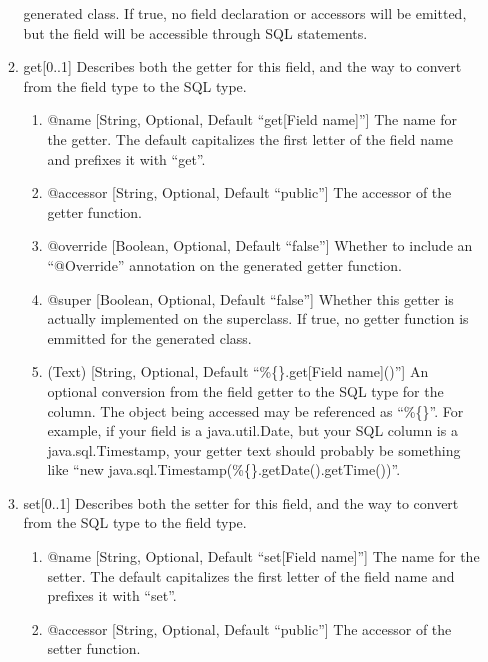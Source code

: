 \documentclass{book}
\begin{document}
\begin{enumerate}
\begin{enumerate}
              generated class. If true, no field declaration or accessors will
              be emitted, but the field will be accessible through SQL
              statements.
        \item get[0..1] Describes both the getter for this field, and the way to
              convert from the field type to the SQL type.
        \begin{enumerate}
            \item @name [String, Optional, Default ``get[Field name]''] The name
                  for the getter. The default capitalizes the first letter of
                  the field name and prefixes it with ``get''.
            \item @accessor [String, Optional, Default ``public''] The accessor
                  of the getter function.
            \item @override [Boolean, Optional, Default ``false''] Whether to
                  include an ``@Override'' annotation on the generated getter
                  function.
            \item @super [Boolean, Optional, Default ``false''] Whether this
                  getter is actually implemented on the superclass. If true,
                  no getter function is emmitted for the generated class.
            \item (Text) [String, Optional, Default ``\%\{\}.get[Field name]()'']
                  An optional conversion from the field getter to the SQL type
                  for the column. The object being accessed may be referenced
                  as ``\%\{\}''. For example, if your field is a java.util.Date,
                  but your SQL column is a java.sql.Timestamp, your getter text
                  should probably be something like
                  ``new java.sql.Timestamp(\%\{\}.getDate().getTime())''.
        \end{enumerate}
        \item set[0..1] Describes both the setter for this field, and the way to
              convert from the SQL type to the field type.
        \begin{enumerate}
            \item @name [String, Optional, Default ``set[Field name]''] The name
                  for the setter. The default capitalizes the first letter of
                  the field name and prefixes it with ``set''.
            \item @accessor [String, Optional, Default ``public''] The accessor
                  of the setter function.

\end{enumerate}
\end{enumerate}
\end{enumerate}
\end{document}
